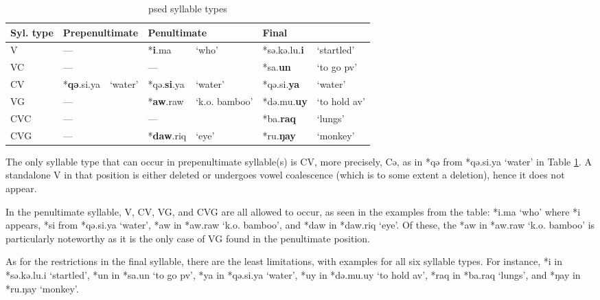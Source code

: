 \begin{table}[!htbp]
\centering
\caption{\acl{psed} syllable types}
\label{tab:psed_syl_type}
\begin{tabular}{lllllll}
\hline
Syl. type     & \multicolumn{2}{l}{Prepenultimate} & \multicolumn{2}{l}{Penultimate} & \multicolumn{2}{l}{Final}        \\ \hline
V             & ---               &                & *\textbf{i}.ma        & `who'            & *sə.kə.lu.\textbf{i} & `startled'         \\
VC            & ---               &                & ---          &                  & *sa.\textbf{un}      & `to go \acs{pv}'   \\
CV            & *\textbf{qə}.si.ya         & `water'        & *qə.\textbf{si}.ya    & `water'          & *qə.si.\textbf{ya}   & `water'            \\
VG            & ---               &                & *\textbf{aw}.raw      & `k.o. bamboo'    & *də.mu.\textbf{uy}   & `to hold \acs{av}' \\
CVC           & ---               &                & ---          &                  & *ba.\textbf{raq}     & `lungs'            \\
CVG           & ---               &                & *\textbf{daw}.riq     & `eye'            & *ru.\textbf{ŋay}     & `monkey'           \\ \hline
\end{tabular}
\end{table}

The only syllable type that can occur in prepenultimate syllable(s) is CV, more precisely, Cə, as in *qə from *qə.si.ya `water' in Table \ref{tab:psed_syl_type}. A standalone V in that position is either deleted or undergoes vowel coalescence (which is to some extent a deletion), hence it does not appear. 

In the penultimate syllable, V, CV, VG, and CVG are all allowed to occur, as seen in the examples from the table: *i.ma `who' where *i appears, *si from *qə.si.ya `water', *aw in *aw.raw `k.o. bamboo', and *daw in *daw.riq `eye'. Of these, the *aw in *aw.raw `k.o. bamboo' is particularly noteworthy as it is the only case of VG found in the penultimate position.

As for the restrictions in the final syllable, there are the least limitations, with examples for all six syllable types. For instance, *i in *sə.kə.lu.i `startled', *un in *sa.un `to go \acs{pv}', *ya in *qə.si.ya `water', *uy in *də.mu.uy `to hold \acs{av}', *raq in *ba.raq `lungs', and *ŋay in *ru.ŋay `monkey'. 

